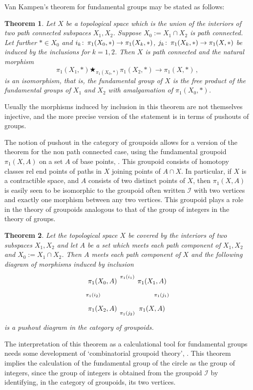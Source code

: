 \documentclass[12pt]{article}
\newtheorem{thm}{Theorem}
\theoremstyle{definition}
\theoremstyle{remark}
\numberwithin{equation}{subsection}
\def\co{\colon\thinspace}
\begin{document}
Van Kampen's theorem for fundamental groups may be stated as
follows:
\begin{thm}
 Let $X$ be a topological space which is the union of the interiors of  two path connected
 subspaces $X_1, X_2$. Suppose $X_0:=X_1\cap X_2$ is path connected. Let
 further $*\in X_0$ and $i_k\co \pi_1(X_0,*)\to\pi_1(X_k,*)$,
 $j_k\co\pi_1(X_k,*)\to\pi_1(X,*)$ be induced by the inclusions for
 $k=1,2$. Then $X$ is path connected and the natural morphism
$$\pi_1(X_1,*)\bigstar_{\pi_1(X_0,*)}\pi_1(X_2,*)\to \pi_1(X,*)\,,$$
is an isomorphism,     that is, the fundamental group of $X$ is the
free product of the
    fundamental groups of $X_1$ and $X_2$ with amalgamation  of $\pi_1(X_0,*)$.
\end{thm}

Usually the morphisms induced by inclusion in this theorem are not
themselves injective, and the more precise version of the  statement
is in terms of {pushouts} of groups.

The notion of pushout in the category of groupoids allows for a
version of the theorem  for the non path connected case, using the
fundamental groupoid $\pi_1(X,A)$  on a set $A$ of base points,
\cite{rb1}. This groupoid consists of homotopy classes rel end
points of paths in $X$ joining points of $A\cap X$. In particular,
if $X$ is a contractible space, and $A$ consists of two distinct
points of $X$, then $\pi_1(X,A)$ is easily seen to be isomorphic to
the groupoid often written $\mathcal I$ with two vertices and
exactly one morphism between any two vertices. This groupoid plays a
role in the theory of groupoids analogous to that of the group of
integers in the theory of groups.


\begin{thm}
Let the topological space $X$ be covered by the interiors of two
subspaces $X_1, X_2$ and let $A$ be a set which meets each path
component of $X_1, X_2$ and $X_0:=X_1 \cap X_2$. Then $A$ meets each
path component of $X$ and the following diagram of morphisms induced
by inclusion
$$\xymatrix{ {\pi_1(X_0,A)}\ar [r]^{\pi_1(i_1)}\ar[d]_{\pi_1(i_2)}
&\pi_1(X_1,A)\ar[d]^{\pi_1(j_1)} \\
{\pi_1(X_2,A)}\ar [r]_{\pi_1(j_2)}&  {\pi_1(X,A)} }
$$
is a  pushout diagram in the category of groupoids.
\end{thm}

The interpretation of this theorem as a calculational tool for
fundamental groups needs some development of `combinatorial groupoid
theory', \cite{rb,higgins}. This theorem implies the calculation of
the fundamental group of the circle as the group of integers, since
the group of integers is obtained from the groupoid $\mathcal I$ by
identifying, in the category of groupoids,  its two vertices.
\end{document}
